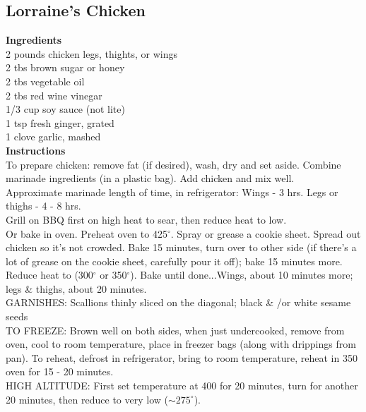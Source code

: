 \documentclass{article}
\numberwithin{figure}{section}
\numberwithin{equation}{section}
\begin{document}
\pagebreak
\subsection{Lorraine's Chicken}
{\bf Ingredients}\\
2 pounds chicken legs, thights, or wings\\
2 tbs brown sugar or honey\\
2 tbs vegetable oil\\
2 tbs red wine vinegar\\
1/3 cup soy sauce (not lite)\\
1 tsp fresh ginger, grated\\
1 clove garlic, mashed\\

{\bf Instructions}\\
To prepare chicken: remove fat (if desired), wash, dry and set aside.  Combine marinade ingredients (in a plastic bag). Add chicken and mix well.\\

Approximate marinade length of time, in refrigerator: Wings - 3 hrs.  Legs or thighs - 4 - 8 hrs.\\

Grill on BBQ first on high heat to sear, then reduce heat to low.\\

Or bake in oven.  Preheat oven to 425$^{\circ}$. Spray or grease a cookie sheet.  Spread out chicken so it's not crowded. Bake 15 minutes, turn over to other side (if there’s a lot of grease on the cookie sheet, carefully pour it off); bake 15 minutes more. Reduce heat to (300$^{\circ}$ or 350$^{\circ}$). Bake until done...Wings, about 10 minutes more;  legs \& thighs, about 20 minutes.\\

GARNISHES: Scallions thinly sliced on the diagonal; black \& /or white sesame seeds\\

TO FREEZE:  Brown well on both sides, when just undercooked, remove from oven, cool to room temperature, place in freezer bags (along with drippings from pan).  To reheat, defrost in refrigerator, bring to room temperature, reheat in 350 oven for 15 - 20 minutes.\\

HIGH ALTITUDE:  First set temperature at 400 for 20 minutes, turn for another 20 minutes, then reduce to very low ($\sim 275^{\circ}$).

\pagebreak
\end{document}
